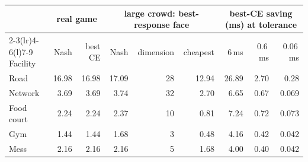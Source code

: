 \begin{tabular}{@{}lrrrrrrrr@{}}\toprule
 & \multicolumn{2}{c}{real game} & \multicolumn{3}{c}{large crowd: best-response face} & \multicolumn{3}{c}{best-CE saving (ms) at tolerance}\\
\cmidrule(lr){2-3}\cmidrule(lr){4-6}\cmidrule(l){7-9}
Facility & Nash & best CE & Nash & dimension & cheapest & 6\,ms & 0.6\,ms & 0.06\,ms\\\midrule
Road & 16.98 & 16.98 & 17.09 & 28 & 12.94 & 26.89 & 2.70 & 0.28\\
Network & 3.69 & 3.69 & 3.74 & 32 & 2.70 & 6.65 & 0.67 & 0.069\\
Food court & 2.24 & 2.24 & 2.37 & 10 & 0.81 & 7.24 & 0.72 & 0.073\\
Gym & 1.44 & 1.44 & 1.68 & 3 & 0.48 & 4.16 & 0.42 & 0.042\\
Mess & 2.16 & 2.16 & 2.16 & 5 & 1.68 & 4.00 & 0.40 & 0.042\\
\bottomrule
\end{tabular}

